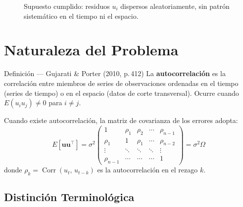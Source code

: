 \documentclass[11pt, letterpaper]{article}
\begin{document}
\begin{figure}[H]
\centering
{}
\caption{Supuesto cumplido: residuos $u_i$ dispersos aleatoriamente,
sin patr\'on sistem\'atico en el tiempo ni el espacio.}
\end{figure}

\section{Naturaleza del Problema}

\begin{definicion}{Definici\'on --- Gujarati \& Porter (2010, p.\,412)}
La \textbf{autocorrelaci\'on} es la correlaci\'on entre miembros de series de
observaciones ordenadas en el tiempo (series de tiempo) o en el espacio
(datos de corte transversal). Ocurre cuando $E(u_i u_j)\neq 0$ para $i\neq j$.
\end{definicion}

Cuando existe autocorrelaci\'on, la matriz de covarianza de los errores adopta:
\[
  E[\mathbf{u}\mathbf{u}^\top] = \sigma^2
  \begin{pmatrix}
    1          & \rho_1    & \rho_2    & \cdots & \rho_{n-1} \\
    \rho_1     & 1         & \rho_1    & \cdots & \rho_{n-2} \\
    \vdots     & \ddots    & \ddots    & \ddots & \vdots     \\
    \rho_{n-1} & \cdots    & \cdots    & \cdots & 1
  \end{pmatrix}
  = \sigma^2 \Omega
\]
donde $\rho_k = \operatorname{Corr}(u_t,\, u_{t-k})$ es la autocorrelaci\'on en el rezago $k$.

\subsection{Distinci\'on Terminol\'ogica}
\end{document}
